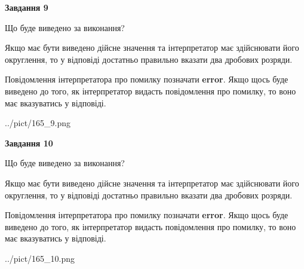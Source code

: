 \documentclass[12pt, ukrainian]{article}
\begin{document}
{\begin {Large}
{\begin {center}\textbf{Завдання 9}\end {center}}\par
Що буде виведено за виконання? \par

Якщо має бути виведено дійсне значення та інтерпретатор має здійснювати його округлення, 
то у відповіді достатньо правильно вказати два дробових розряди.

Повідомлення інтерпретатора про помилку позначати \textbf{error}.
Якщо щось буде виведено до того, як інтерпретатор видасть повідомлення про помилку, 
то воно має вказуватись у відповіді. \par

\begin{center}
	{../pict/165_9.png}
\end{center}
\newpage

{\begin {center}\textbf{Завдання 10}\end {center}}\par
Що буде виведено за виконання? \par

Якщо має бути виведено дійсне значення та інтерпретатор має здійснювати його округлення, 
то у відповіді достатньо правильно вказати два дробових розряди.

Повідомлення інтерпретатора про помилку позначати \textbf{error}.
Якщо щось буде виведено до того, як інтерпретатор видасть повідомлення про помилку, 
то воно має вказуватись у відповіді. \par

\begin{center}
	{../pict/165_10.png}
\end{center}
\newpage

\end {Large}}
\end{document}
